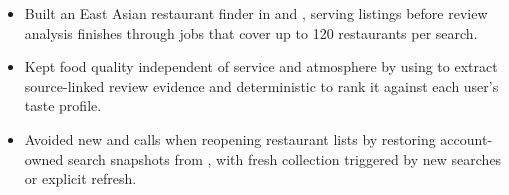 \begin{itemize}
  \item Built an East Asian restaurant finder in  and , serving listings before review analysis finishes through  jobs that cover up to 120 restaurants per search.
  \item Kept food quality independent of service and atmosphere by using  to extract source-linked review evidence and deterministic  to rank it against each user's taste profile.
  \item Avoided new  and  calls when reopening restaurant lists by restoring account-owned search snapshots from , with fresh collection triggered by new searches or explicit refresh.
\end{itemize}
